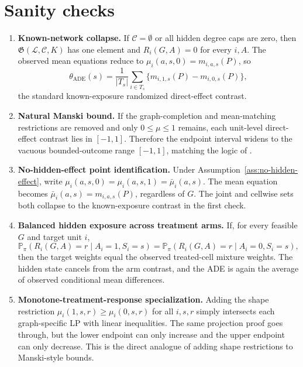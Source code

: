 \documentclass[11pt]{article}
\renewcommand{\Pr}{\mathbb{P}}
\theoremstyle{definition}
\theoremstyle{plain}
\theoremstyle{remark}
\begin{document}
\section{Sanity checks}
\begin{enumerate}[leftmargin=*]
\item \textbf{Known-network collapse.}  If \(\mathcal C=\emptyset\) or all
hidden degree caps are zero, then \(\mathfrak G(\mathcal L,\mathcal C,K)\) has
one element and \(R_i(G,A)=0\) for every \(i,A\).  The observed mean equations
reduce to \(\mu_i(a,s,0)=m_{i,a,s}(P)\), so
\[
\theta_{\mathrm{ADE}}(s)
=\frac1{|T_s|}\sum_{i\in T_s}
\{m_{i,1,s}(P)-m_{i,0,s}(P)\},
\]
the standard known-exposure randomized direct-effect contrast.

\item \textbf{Natural Manski bound.}  If the graph-completion and
mean-matching restrictions are removed and only \(0\le\mu\le1\) remains, each
unit-level direct-effect contrast lies in \([-1,1]\).  Therefore the endpoint
interval widens to the vacuous bounded-outcome range \([-1,1]\), matching the
logic of \cite{Manski1990}.

\item \textbf{No-hidden-effect point identification.}  Under
Assumption~\ref{ass:no-hidden-effect}, write
\(\mu_i(a,s,0)=\mu_i(a,s,1)=\bar\mu_i(a,s)\).  The mean equation becomes
\(\bar\mu_i(a,s)=m_{i,a,s}(P)\), regardless of \(G\).  The joint and cellwise
sets both collapse to the known-exposure contrast in the first check.

\item \textbf{Balanced hidden exposure across treatment arms.}  If, for every
feasible \(G\) and target unit \(i\),
\[
\Pr_\pi(R_i(G,A)=r\mid A_i=1,S_i=s)
=
\Pr_\pi(R_i(G,A)=r\mid A_i=0,S_i=s),
\]
then the target weights equal the observed treated-cell mixture weights.  The
hidden state cancels from the arm contrast, and the ADE is again the average of
observed conditional mean differences.

\item \textbf{Monotone-treatment-response specialization.}  Adding the shape
restriction \(\mu_i(1,s,r)\ge\mu_i(0,s,r)\) for all \(i,s,r\) simply intersects
each graph-specific LP with linear inequalities.  The same projection proof
goes through, but the lower endpoint can only increase and the upper endpoint
can only decrease.  This is the direct analogue of adding shape restrictions to
Manski-style bounds.
\end{enumerate}
\end{document}
